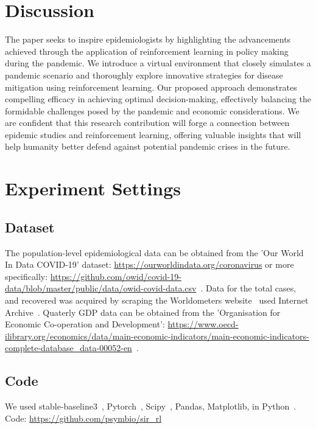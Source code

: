 \documentclass[tikz,fleqn,12pt]{wlscirep}
\begin{document}
\section{Discussion}
The paper seeks to inspire epidemiologists by highlighting the advancements achieved through the application of reinforcement learning in policy making during the pandemic. We introduce a virtual environment that closely simulates a pandemic scenario and thoroughly explore innovative strategies for disease mitigation using reinforcement learning. Our proposed approach demonstrates compelling efficacy in achieving optimal decision-making, effectively balancing the formidable challenges posed by the pandemic and economic considerations. We are confident that this research contribution will forge a connection between epidemic studies and reinforcement learning, offering valuable insights that will help humanity better defend against potential pandemic crises in the future.

\section{Experiment Settings}
\subsection{Dataset}
The population-level epidemiological data can be obtained from the 'Our World In Data COVID-19' dataset: \url{https://ourworldindata.org/coronavirus} or more specifically: \url{https://github.com/owid/covid-19-data/blob/master/public/data/owid-covid-data.csv}~\cite{owidcoronavirus}. Data for the total cases, and recovered was acquired by scraping the Worldometers website~\cite{WorldometerCorona} used Internet Archive~\cite{InternetArchive}. Quaterly GDP data can be obtained from the 'Organisation for Economic Co-operation and Development': \url{https://www.oecd-ilibrary.org/economics/data/main-economic-indicators/main-economic-indicators-complete-database_data-00052-en}~\cite{economic_indicators_data}.

\subsection{Code}
We used stable-baseline3~\cite{JMLR:v22:20-1364}, Pytorch~\cite{paszke2019pytorch}, Scipy~\cite{Virtanen_2020}, Pandas, Matplotlib, in Python~\cite{ScientificPython}.
Code: \url{https://github.com/psymbio/sir_rl}
% 

\end{document}
